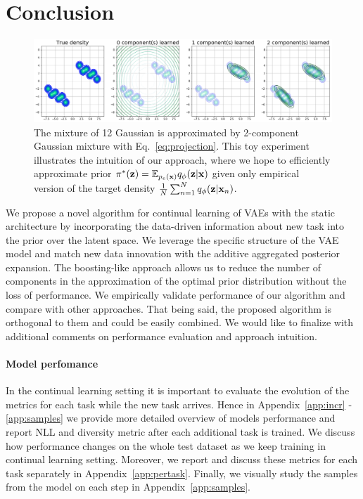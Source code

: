 \section{Conclusion}
\begin{figure}[t]
	\centering
	\includegraphics[width=\textwidth]{pics/1_boovae/mpvi_toy.png}
		\caption{The mixture of 12 Gaussian is approximated by 2-component Gaussian mixture with Eq.~\protect\ref{eq:projection}. This toy experiment illustrates the intuition of our approach, where we hope to efficiently approximate prior $\pi^{*}({\mathbf{z}})=\mathbb{E}_{p_{e}({\mathbf{x}})}q_{\phi}({\mathbf{z}}|{\mathbf{x}})$ given only empirical version of the target density $\frac{1}{N}\sum_{n=1}^{N}q_{\phi}({\mathbf{z}}|{\mathbf{x}}_n)$.}
	\label{fig:mpvi_toy}
\end{figure}
We propose a novel algorithm for continual learning of VAEs with the static architecture by incorporating the data-driven information about new task into the prior over the latent space.
We leverage the specific structure of the VAE model and match new data innovation with the additive aggregated posterior expansion. The boosting-like approach allows us to reduce the number of components in the approximation of the optimal prior distribution without the loss of performance. We empirically validate performance of our algorithm and compare with other approaches. That being said, the proposed algorithm is orthogonal to them and could be easily combined. We would like to finalize with additional comments on performance evaluation and approach intuition.

\paragraph{Model perfomance} In the continual learning setting it is important to evaluate the evolution of the metrics for each task while the new task arrives. Hence in Appendix~\ref{app:incr} - \ref{app:samples} we provide more detailed overview of models performance and report NLL and diversity metric after each additional task is trained. We discuss how performance changes on the whole test dataset as we keep training in continual learning setting. Moreover, we report and discuss these metrics for each task separately in Appendix~\ref{app:pertask}. Finally, we visually study the samples from the model on each step in Appendix~\ref{app:samples}. 
